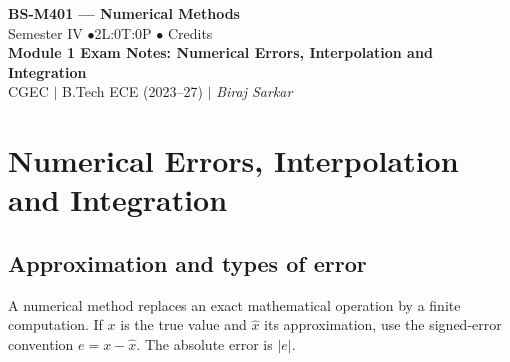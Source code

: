 \documentclass[12pt,a4paper]{article}
\begin{document}
\begin{center}
  {\LARGE\bfseries\color{myred} BS-M401 --- Numerical Methods}\\[5pt]
  {\normalsize\color{mydark} Semester IV \quad$\bullet$\quad 2L:0T:0P \quad$\bullet$ Credits}\\[3pt]
  {\normalsize\color{myteal}\textbf{Module 1 Exam Notes: Numerical Errors, Interpolation and Integration}}\\[3pt]
  {\small\color{mydark} CGEC \;$|$\; B.Tech ECE (2023--27) \;$|$\; \textit{Biraj Sarkar}}
\end{center}
\vspace{2pt}
\noindent{\color{myred}\rule{\linewidth}{1.5pt}}
\vspace{2pt}

\hypersetup{linkcolor=mydark}
\tableofcontents
\hypersetup{linkcolor=myteal}
\newpage

\section{Numerical Errors, Interpolation and Integration}
\subsection{Approximation and types of error}
\begin{tcolorbox}[defbox, title={Numerical approximation}]
A numerical method replaces an exact mathematical operation by a finite computation. If $x$ is the true value and $\hat{x}$ its approximation, use the signed-error convention $e=x-\hat{x}$. The absolute error is $|e|$.
\end{tcolorbox}
\end{document}
